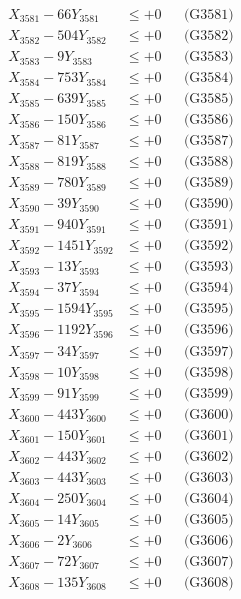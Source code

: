 \documentclass[a4paper,10pt]{article}
\begin{document}
{\begin{align}
\allowbreak
X_{3581} - 66Y_{3581} &\leq +0 && \text{(G3581)} \\
X_{3582} - 504Y_{3582} &\leq +0 && \text{(G3582)} \\
X_{3583} - 9Y_{3583} &\leq +0 && \text{(G3583)} \\
X_{3584} - 753Y_{3584} &\leq +0 && \text{(G3584)} \\
X_{3585} - 639Y_{3585} &\leq +0 && \text{(G3585)} \\
X_{3586} - 150Y_{3586} &\leq +0 && \text{(G3586)} \\
X_{3587} - 81Y_{3587} &\leq +0 && \text{(G3587)} \\
X_{3588} - 819Y_{3588} &\leq +0 && \text{(G3588)} \\
X_{3589} - 780Y_{3589} &\leq +0 && \text{(G3589)} \\
X_{3590} - 39Y_{3590} &\leq +0 && \text{(G3590)} \\
\allowbreak
X_{3591} - 940Y_{3591} &\leq +0 && \text{(G3591)} \\
X_{3592} - 1451Y_{3592} &\leq +0 && \text{(G3592)} \\
X_{3593} - 13Y_{3593} &\leq +0 && \text{(G3593)} \\
X_{3594} - 37Y_{3594} &\leq +0 && \text{(G3594)} \\
X_{3595} - 1594Y_{3595} &\leq +0 && \text{(G3595)} \\
X_{3596} - 1192Y_{3596} &\leq +0 && \text{(G3596)} \\
X_{3597} - 34Y_{3597} &\leq +0 && \text{(G3597)} \\
X_{3598} - 10Y_{3598} &\leq +0 && \text{(G3598)} \\
X_{3599} - 91Y_{3599} &\leq +0 && \text{(G3599)} \\
X_{3600} - 443Y_{3600} &\leq +0 && \text{(G3600)} \\
\allowbreak
X_{3601} - 150Y_{3601} &\leq +0 && \text{(G3601)} \\
X_{3602} - 443Y_{3602} &\leq +0 && \text{(G3602)} \\
X_{3603} - 443Y_{3603} &\leq +0 && \text{(G3603)} \\
X_{3604} - 250Y_{3604} &\leq +0 && \text{(G3604)} \\
X_{3605} - 14Y_{3605} &\leq +0 && \text{(G3605)} \\
X_{3606} - 2Y_{3606} &\leq +0 && \text{(G3606)} \\
X_{3607} - 72Y_{3607} &\leq +0 && \text{(G3607)} \\
X_{3608} - 135Y_{3608} &\leq +0 && \text{(G3608)} \\

\end{align}}
\end{document}
